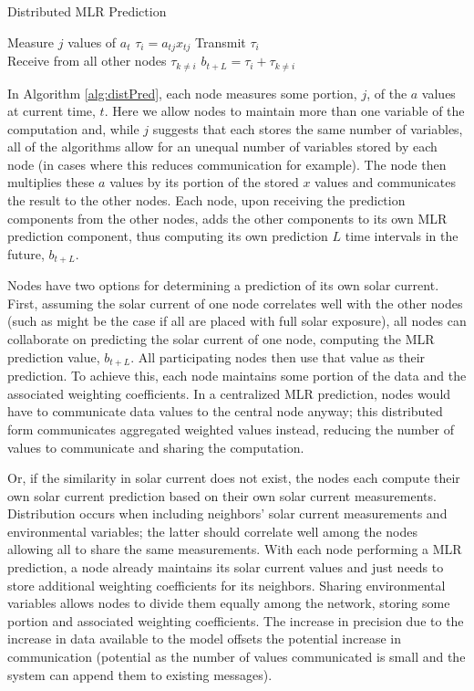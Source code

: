 \documentclass[prodmode,acmtosn]{acmsmall}
\begin{document}
\begin{algorithm}
\caption{Distributed MLR Prediction}\label{alg:distPred}
\begin{algorithmic}[1]
\State Measure $j$ values of $a_{t}$
\State $\tau_i=a_{tj}x_{tj}$
\State Transmit $\tau_i$ \\
\State Receive from all other nodes $\tau_{k \ne i}$
\State $b_{t+L}=\tau_i+\tau_{k \ne i}$
\EndFor
\end{algorithmic}
\end{algorithm}

In Algorithm \ref{alg:distPred}, each node measures some portion, $j$, of the $a$ values at current time, $t$.
Here we allow nodes to maintain more than one variable of the computation and, while $j$ suggests that each stores the same number of variables, all of the algorithms allow for an unequal number of variables stored by each node (in cases where this reduces communication for example).
The node then multiplies these $a$ values by its portion of the stored $x$ values and communicates the result to the other nodes.
Each node, upon receiving the prediction components from the other nodes, adds the other components to its own MLR prediction component, thus computing its own prediction $L$ time intervals in the future, $b_{t+L}$.

Nodes have two options for determining a prediction of its own solar current.
First, assuming the solar current of one node correlates well with the other nodes (such as might be the case if all are placed with full solar exposure), all nodes can collaborate on predicting the solar current of one node, computing the MLR prediction value, $b_{t+L}$.
All participating nodes then use that value as their prediction.
To achieve this, each node maintains some portion of the data and the associated weighting coefficients.
In a centralized MLR prediction, nodes would have to communicate data values to the central node anyway; this distributed form communicates aggregated weighted values instead, reducing the number of values to communicate and sharing the computation.

Or, if the similarity in solar current does not exist, the nodes each compute their own solar current prediction based on their own solar current measurements.
Distribution occurs when including neighbors' solar current measurements and environmental variables; the latter should correlate well among the nodes allowing all to share the same measurements.
With each node performing a MLR prediction, a node already maintains its solar current values and just needs to store additional weighting coefficients for its neighbors.
Sharing environmental variables allows nodes to divide them equally among the network, storing some portion and associated weighting coefficients.
The increase in precision due to the increase in data available to the model offsets the potential increase in communication (potential as the number of values communicated is small and the system can append them to existing messages).
\end{document}
